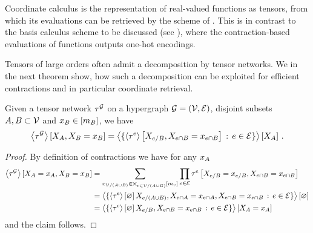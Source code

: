 Coordinate calculus is the representation of real-valued functions as tensors, from which its evaluations can be retrieved by the scheme of .
This is in contrast to the basis calculus scheme to be discussed (see ), where the contraction-based evaluations of functions outputs one-hot encodings.

Tensors of large orders often admit a decomposition by tensor networks.
We in the next theorem show, how such a decomposition can be exploited for efficient contractions and in particular coordinate retrieval.

\begin{theorem}
    \label{the:slicedContractionToCores}
    Given a tensor network $\tau^{\mathcal{G}}$ on a hypergraph $\mathcal{G}=(\mathcal{V},\mathcal{E})$, disjoint subsets $A,B\subset\mathcal{V}$ and $x_{B}\in[m_{B}]$, we have
    \begin{align*}
        \left\langle \tau^{\mathcal{G}}\right\rangle \left[ X_{A},X_{B}=x_{B} \right]
        = \left\langle 
            \{\left\langle \tau^{e}\right\rangle \left[ X_{e/B},X_{e\cap B}=x_{e\cap B} \right] \, : \, e\in\mathcal{E} \}
        \right\rangle \left[ X_{A} \right] \, .
    \end{align*}
\end{theorem}
\begin{proof}
    By definition of contractions we have for any $x_{A}$
    \begin{align*}
        \left\langle \tau^{\mathcal{G}}\right\rangle \left[ X_{A}=x_{A},X_{B}=x_{B} \right]
        &= \sum_{x_{\mathcal{V}/(A\cup B)}\in\bigtimes_{v\in\mathcal{V}/(A\cup B)}[m_{v}]} \prod_{e\in\mathcal{E}} \tau^{e}\left[X_{e/B}=x_{e/B},X_{e\cap B}=x_{e\cap B}\right] \\
        &= \left\langle 
            \{\left\langle \tau^{e}\right\rangle \left[ \varnothing \right]{X_{e/(A\cup B)},X_{e\cap A}=x_{e\cap A},X_{e\cap B}=x_{e\cap B}} \, : \, e\in\mathcal{E} \}
        \right\rangle \left[ \varnothing \right] \\
        &= \left\langle 
            \{\left\langle \tau^{e}\right\rangle \left[ \varnothing \right]{X_{e/B},X_{e\cap B}=x_{e\cap B}} \, : \, e\in\mathcal{E} \}
        \right\rangle \left[ X_{A}=x_{A} \right]
    \end{align*}
    and the claim follows.
\end{proof}

